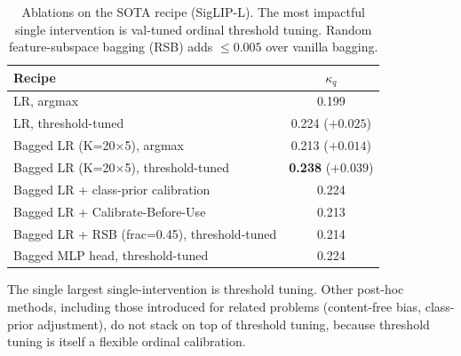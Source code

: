\begin{table}[t]
\caption{Ablations on the SOTA recipe (SigLIP-L). The most
impactful single intervention is val-tuned ordinal threshold
tuning. Random feature-subspace bagging (RSB) adds $\le 0.005$ over
vanilla bagging.}
\label{tab:abl-recipe}
\centering
\small
\begin{tabular}{lc}
\toprule
Recipe & $\kappa_q$ \\
\midrule
LR, argmax & 0.199\\
LR, threshold-tuned & 0.224 \;\;\;($+0.025$)\\
Bagged LR (K=20$\times$5), argmax & 0.213 \;\;($+0.014$)\\
Bagged LR (K=20$\times$5), threshold-tuned & \textbf{0.238} \;\;($+0.039$)\\
Bagged LR + class-prior calibration & 0.224\\
Bagged LR + Calibrate-Before-Use & 0.213\\
Bagged LR + RSB (frac=0.45), threshold-tuned & 0.214\\
Bagged MLP head, threshold-tuned & 0.224\\
\bottomrule
\end{tabular}
\end{table}

The single largest single-intervention is threshold tuning. Other
post-hoc methods, including those introduced for related problems
(content-free bias, class-prior adjustment), do not stack on top
of threshold tuning, because threshold tuning is itself a flexible
ordinal calibration.
